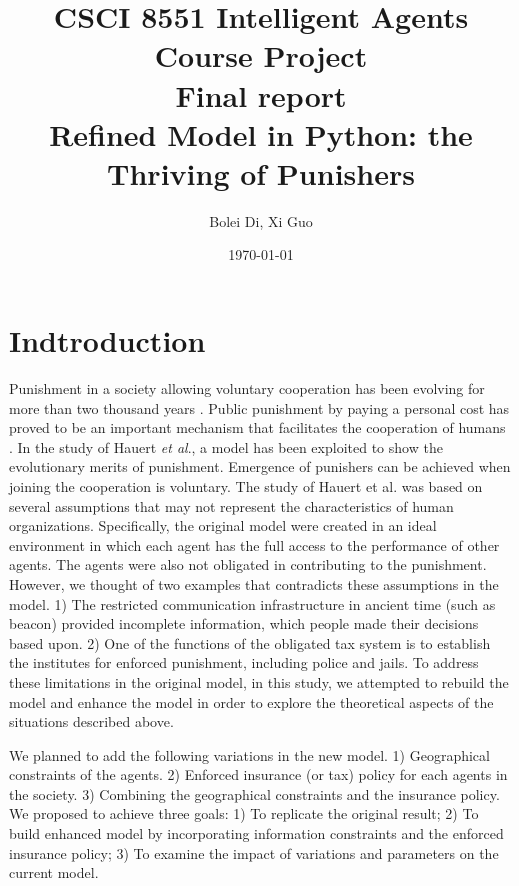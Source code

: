 \documentclass[11pt]{article}
\begin{document}
\title{\bf CSCI 8551 Intelligent Agents Course Project\\
Final report\\
Refined Model in Python: the Thriving of Punishers
}
\date{\today}
\author{Bolei Di, Xi Guo}
\maketitle

\section{Indtroduction}
Punishment in a society allowing voluntary cooperation has been evolving for more than two thousand years \cite{morris1995oxford}. Public punishment by paying a personal cost has proved to be an important mechanism that facilitates the cooperation of humans \cite{hauert2007via}. In the study of Hauert \textit{et al}., a model has been exploited to show the evolutionary merits of punishment. Emergence of punishers can be achieved when joining the cooperation is voluntary. The study of Hauert et al. was based on several assumptions that may not represent the characteristics of human organizations. Specifically, the original model were created in an ideal environment in which each agent has the full access to the performance of other agents. The agents were also not obligated in contributing to the punishment. However, we thought of two examples that contradicts these assumptions in the model. 1) The restricted communication infrastructure in ancient time (such as beacon) provided incomplete information, which people made their decisions based upon. 2) One of the functions of the obligated tax system is to establish the institutes for enforced punishment, including police and jails. To address these limitations in the original model, in this study, we attempted to rebuild the model and enhance the model in order to explore the theoretical aspects of the situations described above.

We planned to add the following variations in the new model. 1) Geographical constraints of the agents. 2) Enforced insurance (or tax) policy for each agents in the society. 3) Combining the geographical constraints and the insurance policy. We proposed to achieve three goals: 1) To replicate the original result; 2) To build enhanced model by incorporating information constraints and the enforced insurance policy; 3) To examine the impact of variations and parameters on the current model.
\end{document}
